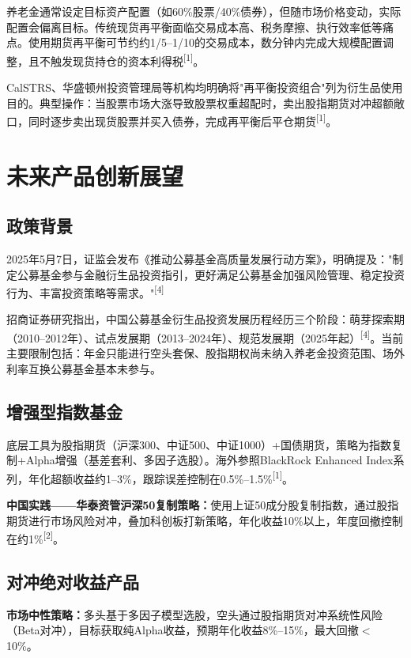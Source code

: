 \documentclass[10pt,a4paper,twocolumn]{ctexart}
\begin{document}
养老金通常设定目标资产配置（如60\%股票/40\%债券），但随市场价格变动，实际配置会偏离目标。传统现货再平衡面临交易成本高、税务摩擦、执行效率低等痛点。使用期货再平衡可节约约1/5--1/10的交易成本，数分钟内完成大规模配置调整，且不触发现货持仓的资本利得税\textsuperscript{[1]}。

CalSTRS、华盛顿州投资管理局等机构均明确将"再平衡投资组合"列为衍生品使用目的。典型操作：当股票市场大涨导致股票权重超配时，卖出股指期货对冲超额敞口，同时逐步卖出现货股票并买入债券，完成再平衡后平仓期货\textsuperscript{[1]}。


\section{未来产品创新展望}

\subsection{政策背景}

2025年5月7日，证监会发布《推动公募基金高质量发展行动方案》，明确提及："制定公募基金参与金融衍生品投资指引，更好满足公募基金加强风险管理、稳定投资行为、丰富投资策略等需求。"\textsuperscript{[4]}

招商证券研究指出，中国公募基金衍生品投资发展历程经历三个阶段：萌芽探索期（2010--2012年）、试点发展期（2013--2024年）、规范发展期（2025年起）\textsuperscript{[4]}。当前主要限制包括：年金只能进行空头套保、股指期权尚未纳入养老金投资范围、场外利率互换公募基金基本未参与。

\subsection{增强型指数基金}

底层工具为股指期货（沪深300、中证500、中证1000）+国债期货，策略为指数复制+Alpha增强（基差套利、多因子选股）。海外参照BlackRock Enhanced Index系列，年化超额收益约1--3\%，跟踪误差控制在0.5\%--1.5\%\textsuperscript{[1]}。

\textbf{中国实践——华泰资管沪深50复制策略：}使用上证50成分股复制指数，通过股指期货进行市场风险对冲，叠加科创板打新策略，年化收益10\%以上，年度回撤控制在约1\%\textsuperscript{[2]}。

\subsection{对冲绝对收益产品}

\textbf{市场中性策略：}多头基于多因子模型选股，空头通过股指期货对冲系统性风险（Beta对冲），目标获取纯Alpha收益，预期年化收益8\%--15\%，最大回撤$<$10\%。
\end{document}
